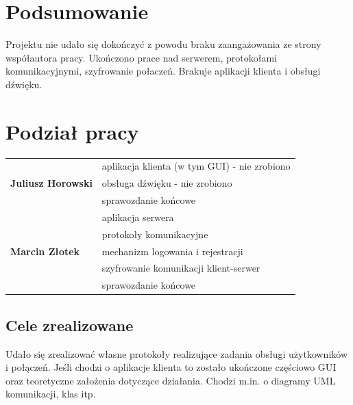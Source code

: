 \documentclass[12pt,a4paper]{article}
\begin{document}
	
	
	\pagebreak
	\section{Podsumowanie}
	\par Projektu nie udało się dokończyć z powodu braku zaangażowania ze strony współautora pracy. Ukończono prace nad serwerem, protokołami komunikacyjnymi, szyfrowanie połaczeń. Brakuje aplikacji klienta i obsługi dźwięku.
			
	\section{Podział pracy}
	
	\begin{table}[h!]
		\begin{center}
			\label{tab:table1}
			\begin{tabular}{|p{}|p{}|}
				
				\hline
				\multirow{3}{*}{\large\textbf{Juliusz Horowski}} & aplikacja klienta (w tym GUI) - nie zrobiono\\
				\cline{2-2} & obsługa dźwięku - nie zrobiono \\
				\cline{2-2} & sprawozdanie końcowe \\
				\hline
				\multirow{5}{*}{\large\textbf{Marcin Złotek}} & aplikacja serwera \\
				\cline{2-2} & protokoły komunikacyjne \\
				\cline{2-2} & mechanizm logowania i rejestracji \\
				\cline{2-2} & szyfrowanie komunikacji klient-serwer \\
				\cline{2-2} & sprawozdanie końcowe \\
				\hline

			\end{tabular}
		\end{center}
	\end{table}
	
	\subsection{Cele zrealizowane}
	\par Udało się zrealizować własne protokoły realizujące zadania obsługi użytkowników i połączeń. Jeśli chodzi o aplikacje klienta to zostało ukończone częściowo GUI oraz teoretyczne założenia dotyczące działania. Chodzi m.in. o diagramy UML komunikacji, klas itp. 
	
\end{document}

